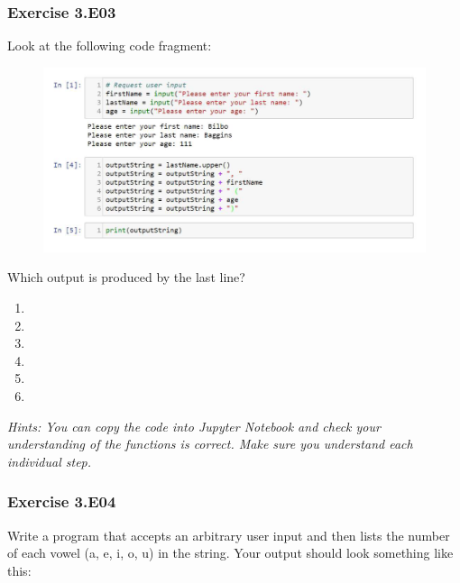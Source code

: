 

\subsubsection*{Exercise 3.E03}
Look at the following code fragment:

\begin{figure}[H]
		\centering
		\includegraphics[width=\textwidth]{../IMG/3E03.png} 
\end{figure}


Which output is produced by the last line?
\begin{enumerate}[label=(\alph*)]
	\item {}
	\item {}
	\item {}
	\item {}
	\item {}
	\item {}
\end{enumerate}


\textit{Hints:
You can copy the code into Jupyter Notebook and check your understanding of the functions
is correct. Make sure you understand each individual step.}\\[1cm]




\subsubsection*{Exercise 3.E04}
Write a program that accepts an arbitrary user input and then lists the number of each
vowel (a, e, i, o, u) in the string. Your output should look something like this:\\

